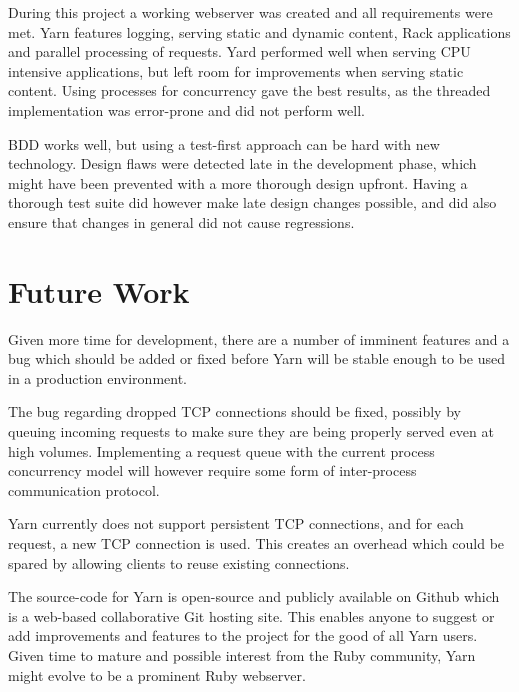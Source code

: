 % 
During this project a working webserver was created and all requirements were met. Yarn features
logging, serving static and dynamic content, Rack applications and parallel
processing of requests. Yard performed well when serving CPU intensive
applications, but left room for improvements when serving static content.
Using processes for concurrency gave the best results, as the threaded
implementation was error-prone and did not perform well.

BDD works well, but using a test-first approach can be hard with new
technology. Design flaws were detected late in the development phase, which
might have been prevented with a more thorough design upfront. Having a
thorough test suite did however make late design changes possible, and did
also ensure that changes in general did not cause regressions.

\section{Future Work}
Given more time for development, there are a number of imminent features and
a bug which should be added or fixed before Yarn will be stable enough to be
used in a production environment.

The bug regarding dropped TCP connections should be fixed, possibly by
queuing incoming requests to make sure they are being properly served
even at high volumes. Implementing a request queue with the current process
concurrency model will however require some form of inter-process communication
protocol.

Yarn currently does not support persistent TCP connections, and for each
request, a new TCP connection is used. This creates an overhead which could be
spared by allowing clients to reuse existing connections.

The source-code for Yarn is open-source and publicly available on Github which
is a web-based collaborative Git hosting site. This enables anyone to suggest
or add improvements and features to the project for the good of all Yarn
users. Given time to mature and possible interest from the Ruby community,
Yarn might evolve to be a prominent Ruby webserver.
